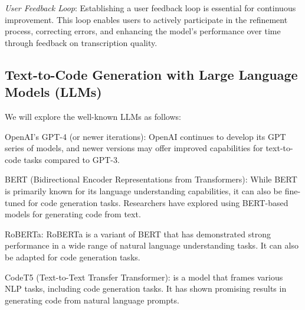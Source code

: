 {\em User Feedback Loop}: Establishing a user feedback loop is essential for
continuous improvement. This loop enables users to actively
participate in the refinement process, correcting errors, and
enhancing the model's performance over time through feedback on
transcription quality.

\subsection{Text-to-Code Generation with Large Language Models (LLMs)}



We will explore the well-known LLMs as follows:

OpenAI's GPT-4 (or newer iterations): OpenAI continues to develop its GPT series of models, and newer versions may offer improved capabilities for text-to-code tasks compared to GPT-3.

BERT (Bidirectional Encoder Representations from Transformers): While BERT is primarily known for its language understanding capabilities, it can also be fine-tuned for code generation tasks. Researchers have explored using BERT-based models for generating code from text.

RoBERTa: RoBERTa is a variant of BERT that has demonstrated strong performance in a wide range of natural language understanding tasks. It can also be adapted for code generation tasks.

CodeT5 (Text-to-Text Transfer Transformer): is a model that frames various NLP tasks, including code generation tasks. It has shown promising results in generating code from natural language prompts.



